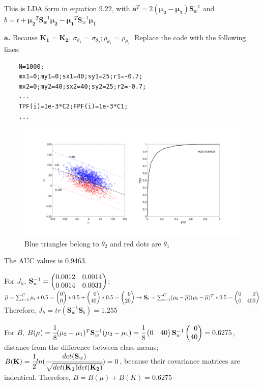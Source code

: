 \documentclass[12pt,a4paper]{article}
\begin{document}
    This is LDA form in equation 9.22, with $\mathbf{a}^T=2(\pmb{\mu_2}-\pmb{\mu_1})\mathbf{S}_w^{-1}$ and $b=t+\pmb{\mu_2}^T\mathbf{S}_w^{-1}\pmb{\mu_2}-\pmb{\mu_1}^T\mathbf{S}_w^{-1}\pmb{\mu_1}$

    \newpage
    \textbf{a.}
    Because $\mathbf{K_1=K_2}$, $\sigma_{\theta_1}=\sigma_{\theta_2};\rho_{\theta_1}=\rho_{\theta_2}$. Replace the code with the following lines:
    \begin{lstlisting}
    N=1000;
    mx1=0;my1=0;sx1=40;sy1=25;r1=-0.7;
    mx2=0;my2=40;sx2=40;sy2=25;r2=-0.7;
    ...
    TPF(i)=1e-3*C2;FPF(i)=1e-3*C1;
    ...
    \end{lstlisting}
    \begin{figure}[!ht]
        \includegraphics*[width=\textwidth]{hw9_3a.png}
        \caption{Blue triangles belong to  $\theta_2$ and red dots are $\theta_1$}
    \end{figure}
    The AUC values is 0.9463. 

    For $J_h$, $\mathbf{S}_w^{-1}=\newvec{0.0012&0.0014\\0.0014&0.0031}$; \\ $\overline \mu=\sum_{i=1}^C\mu_i*0.5=\newvec{0\\0}*0.5+\newvec{0\\40}*0.5=\newvec{0\\20}\rightarrow\\
    \mathbf{S}_b=\sum_{i=1}^C(\mathbf{\mu_i-\overline \mu})(\mathbf{\mu_i-\overline \mu})^T*0.5=\newvec{0&0\\0&400}$\\
    Therefore, $J_h=tr(\mathbf{S}_w^{-1}\mathbf{S}_b)=1.255$

    \vspace{0.3cm}
    For $B$, $B(\mu)=\cfrac{1}{8}(\mu_2-\mu_1)^T\mathbf{S}_w^{-1}(\mu_2-\mu_1)=\cfrac{1}{8}\newvec{0&40}\mathbf{S}_w^{-1}\newvec{0\\40}=0.6275$, distance from the difference between class means;\\
    $B(\mathbf{K})=\cfrac{1}{2}ln(\cfrac{det(\mathbf{S}_w)}{\sqrt{det(\mathbf{K_1})det(\mathbf{K_2})}})=0$, because their covariance matrices are indentical. Therefore, $B=B(\mu)+B(K)=0.6275$
\end{document}
